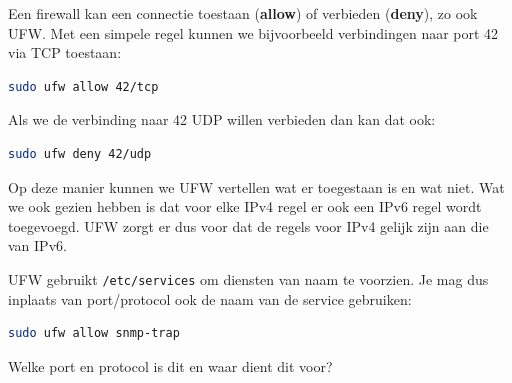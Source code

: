 Een firewall kan een connectie toestaan (\textbf{allow}) of verbieden (\textbf{deny}), zo ook UFW. Met een simpele regel kunnen we bijvoorbeeld verbindingen naar port 42 via TCP toestaan:
\begin{lstlisting}[language=bash]
sudo ufw allow 42/tcp
\end{lstlisting}

Als we de verbinding naar 42 UDP willen verbieden dan kan dat ook:
\begin{lstlisting}[language=bash]
sudo ufw deny 42/udp
\end{lstlisting}

Op deze manier kunnen we UFW vertellen wat er toegestaan is en wat niet. Wat we ook gezien hebben is dat voor elke IPv4 regel er ook een IPv6 regel wordt toegevoegd. UFW zorgt er dus voor dat de regels voor IPv4 gelijk zijn aan die van IPv6.

UFW gebruikt \texttt{/etc/services} om diensten van naam te voorzien. Je mag dus inplaats van port/protocol ook de naam van de service gebruiken:
\begin{lstlisting}[language=bash]
sudo ufw allow snmp-trap
\end{lstlisting}
Welke port en protocol is dit en waar dient dit voor?


